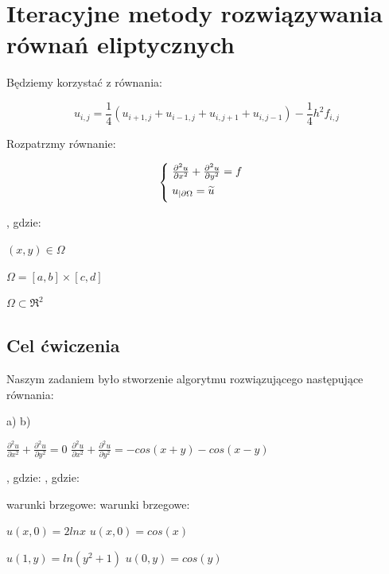 \section{Iteracyjne metody rozwiązywania równań eliptycznych}

Będziemy korzystać z równania:

$$u_{i,j} = \frac{1}{4}(u_{i+1,j} + u_{i-1,j} + u_{i,j+1} + u_{i,j-1}) - \frac{1}{4}h^2f_{i,j}$$

\vspace{0.5cm}

Rozpatrzmy równanie:

\[
\begin{cases}
\vspace{0.1cm} 
\hspace{0,1cm}\frac{\partial^2 u}{\partial x^2} + \frac{\partial^2 u}{\partial y^2} = f\\
\vspace{0.1cm}
\hspace{0,1cm}u_{|\partial \Omega} = \widetilde{u} \\
\end{cases}
\]

, gdzie:

$(x,y) \in \Omega$

$\Omega = [a,b] \times [c,d]$

$\Omega \subset \Re^2$

\subsection{Cel ćwiczenia}

Naszym zadaniem było stworzenie algorytmu rozwiązującego następujące równania:

a) \hspace{6cm} b)

$\frac{\partial^2 u}{\partial x^2} + \frac{\partial^2 u}{\partial y^2} = 0$ \hspace{4.15cm} $\frac{\partial^2 u}{\partial x^2} + \frac{\partial^2 u}{\partial y^2} = -cos(x+y)-cos(x-y)$

, gdzie: \hspace{5.2cm} , gdzie:

warunki brzegowe: \hspace{3.5cm} warunki brzegowe:

$u(x,0) = 2lnx$ \hspace{4.15cm} $u(x,0) = cos(x)$

$u(1,y) = ln(y^2 + 1)$ \hspace{3.3cm} $u(0,y) = cos(y)$

